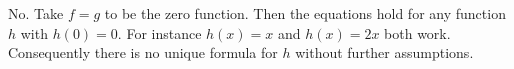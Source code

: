 No. Take $f=g$ to be the zero function. Then the equations hold for any function $h$ with $h(0)=0$. For instance $h(x)=x$ and $h(x)=2x$ both work. Consequently there is no unique formula for $h$ without further assumptions.

